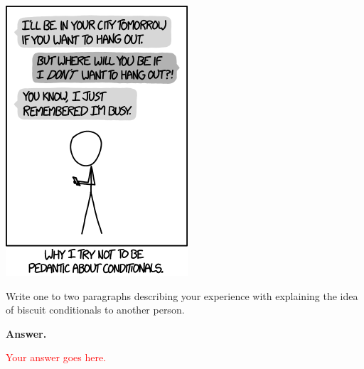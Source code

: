 \documentclass[12pt]{article}
\newcommand{\todo}[1]{\textcolor{red}{#1}}
\newenvironment{problem}[2][Problem]{\begin{trivlist}
\item[\hskip \labelsep {\bfseries #1}\hskip \labelsep {\bfseries #2.}]}{\end{trivlist}}
\begin{document}
\begin{problem}{1}
\begin{enumerate}[label=\Alph*.]
\begin{center}
\includegraphics[scale=0.7]{conditionals.png}
\end{center}

Write one to two paragraphs describing your experience with explaining the idea of biscuit conditionals to another person.

\textbf{Answer.} 

\todo{Your answer goes here.}

\end{enumerate}

\end{problem}





\newpage
\end{document}
